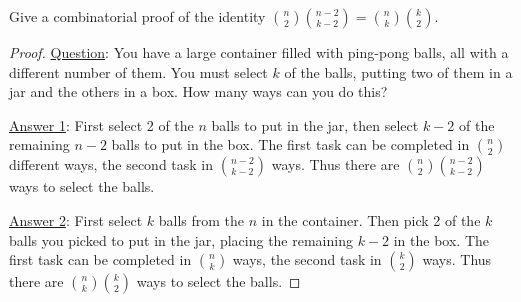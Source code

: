 \begin{questions}
	\begin{answer}
	\end{answer}
	

\question Give a combinatorial proof of the identity ${n \choose 2}{n-2 \choose k-2} = {n\choose k}{k \choose 2}$.

	\begin{answer}
		\begin{proof}
		\underline{Question}: You have a large container filled with ping-pong balls, all with a different number of them.  You must select $k$ of the balls, putting two of them in a jar and the others in a box.  How many ways can you do this?
		
		\underline{Answer 1}: First select 2 of the $n$ balls to put in the jar, then select $k-2$ of the remaining $n-2$ balls to put in the box.  The first task can be completed in ${n \choose 2}$ different ways, the second task in ${n-2 \choose k-2}$ ways.  Thus there are ${n \choose 2}{n-2 \choose k-2}$ ways to select the balls.
		
		\underline{Answer 2}:  First select $k$ balls from the $n$ in the container.  Then pick 2 of the $k$ balls you picked to put in the jar, placing the remaining $k-2$ in the box.  The first task can be completed in ${n \choose k}$ ways, the second task in ${k \choose 2}$ ways.  Thus there are ${n \choose k}{k \choose 2}$ ways to select the balls.
		

\end{proof}
\end{answer}
\end{questions}
